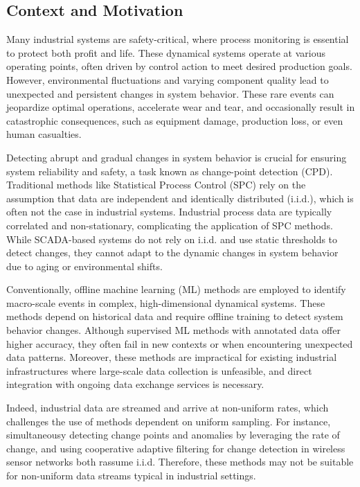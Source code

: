 \subsection{Context and Motivation}
Many industrial systems are safety-critical, where process monitoring is essential to protect both profit and life. These dynamical systems operate at various operating points, often driven by control action to meet desired production goals. However, environmental fluctuations and varying component quality lead to unexpected and persistent changes in system behavior. These rare events can jeopardize optimal operations, accelerate wear and tear, and occasionally result in catastrophic consequences, such as equipment damage, production loss, or even human casualties.

Detecting abrupt and gradual changes in system behavior is crucial for ensuring system reliability and safety, a task known as change-point detection (CPD). Traditional methods like Statistical Process Control (SPC) rely on the assumption that data are independent and identically distributed (i.i.d.), which is often not the case in industrial systems. Industrial process data are typically correlated and non-stationary, complicating the application of SPC methods. While SCADA-based systems do not rely on i.i.d. and use static thresholds to detect changes, they cannot adapt to the dynamic changes in system behavior due to aging or environmental shifts.

Conventionally, offline machine learning (ML) methods are employed to identify macro-scale events in complex, high-dimensional dynamical systems. These methods depend on historical data and require offline training to detect system behavior changes. Although supervised ML methods with annotated data offer higher accuracy, they often fail in new contexts or when encountering unexpected data patterns. Moreover, these methods are impractical for existing industrial infrastructures where large-scale data collection is unfeasible, and direct integration with ongoing data exchange services is necessary.

Indeed, industrial data are streamed and arrive at non-uniform rates, which challenges the use of methods dependent on uniform sampling. For instance, \citet{Liu2023} simultaneousy detecting change points and anomalies by leveraging the rate of change, and \citet{Fathy2019} using cooperative adaptive filtering for change detection in wireless sensor networks both rassume i.i.d. Therefore, these methods may not be suitable for non-uniform data streams typical in industrial settings.

